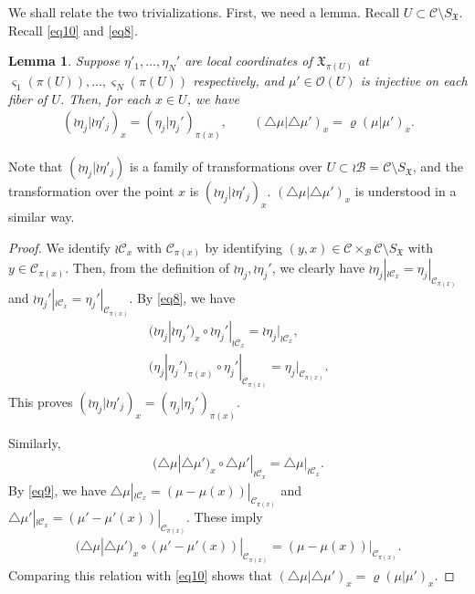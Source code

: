\documentclass[12pt,a4paper,notitlepage]{article}
\theoremstyle{definition}
\theoremstyle{plain}
\newtheorem{lm}[df]{Lemma}
\newcommand{\fk}{\mathfrak}
\newcommand{\mc}{\mathcal}
\newcommand{\scr}{\mathscr}
\newcommand{\sgm}{\varsigma}
\newcommand{\SX}{{S_{\fk X}}}
\numberwithin{equation}{section}
\begin{document}
We shall relate the two trivializations. First, we need a lemma. Recall $U\subset\mc C\setminus\SX$. Recall \eqref{eq10} and \eqref{eq8}.


\begin{lm}\label{lb3}
Suppose $\eta'_1,\dots,\eta_N'$ are local coordinates of $\fk X_{\pi(U)}$ at $\sgm_1(\pi(U)),\dots,\sgm_N(\pi(U))$ respectively, and $\mu'\in\scr O(U)$ is injective on each fiber of $U$. Then, for each $x\in U$, we have
\begin{gather*}
(\wr\eta_j|\wr\eta'_j)_x=(\eta_j|\eta_j')_{\pi(x)},\qquad (\triangle\mu|\triangle\mu')_x=\varrho(\mu|\mu')_x.
\end{gather*}
\end{lm}

Note that $(\wr\eta_j|\wr\eta'_j)$ is a family of transformations over $U\subset\wr\mc B=\mc C\setminus\SX$, and the transformation over the point $x$ is $(\wr\eta_j|\wr\eta'_j)_x$. $(\triangle\mu|\triangle\mu')_x$ is understood in a similar way.


\begin{proof}
We identify $\wr\mc C_x$ with $\mc C_{\pi(x)}$ by identifying $(y,x)\in\mc C\times_{\mc B}\mc C\setminus\SX$ with $y\in\mc C_{\pi(x)}$. Then, from the definition of $\wr\eta_j,\wr\eta_j'$, we clearly have $\wr\eta_j|_{\wr\mc C_x}=\eta_j|_{\mc C_{\pi(x)}}$ and $\wr\eta_j'|_{\wr\mc C_x}=\eta_j'|_{\mc C_{\pi(x)}}$. By \eqref{eq8}, we have
\begin{gather*}
(\wr\eta_j|\wr\eta_j')_x\circ\wr\eta_j'|_{\wr\mc C_x}=\wr\eta_j|_{\wr\mc C_x},\\
(\eta_j|\eta_j')_{\pi(x)}\circ\eta_j'|_{\mc C_{\pi(x)}}=\eta_j|_{\mc C_{\pi(x)}}.
\end{gather*}
This proves $(\wr\eta_j|\wr\eta'_j)_x=(\eta_j|\eta_j')_{\pi(x)}$. 

Similarly, 
\begin{gather*}
(\triangle\mu|\triangle\mu')_x\circ\triangle\mu'|_{\wr\mc C_x}=\triangle\mu|_{\wr\mc C_x}.
\end{gather*}
By \eqref{eq9}, we have $\triangle\mu|_{\wr\mc C_x}=(\mu-\mu(x))|_{\mc C_{\pi(x)}}$ and $\triangle\mu'|_{\wr\mc C_x}=(\mu'-\mu'(x))|_{\mc C_{\pi(x)}}$. These imply
\begin{gather*}
(\triangle\mu|\triangle\mu')_x\circ(\mu'-\mu'(x))|_{\mc C_{\pi(x)}}=(\mu-\mu(x))|_{\mc C_{\pi(x)}}.
\end{gather*}
Comparing this relation with \eqref{eq10} shows that $(\triangle\mu|\triangle\mu')_x=\varrho(\mu|\mu')_x$.
\end{proof}
\end{document}
